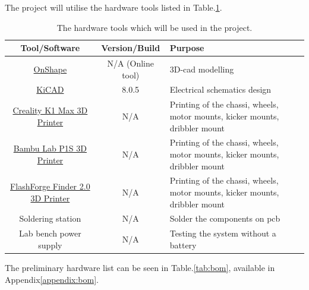 The project will utilise the hardware tools listed in Table.\:\ref{tab:harware_tools}.
\begin{table}[H]
    \centering
    \caption{The hardware tools which will be used in the project.}
    \label{tab:harware_tools}
    \begin{tabularx}{\textwidth}{|c|c|X|} \hline
         \textbf{Tool/Software} & \textbf{Version/Build} & \textbf{Purpose} \\ \hline
         \href{https://www.onshape.com/en/}{OnShape} & N/A (Online tool) & 3D-\acs{cad} modelling \\ \hline
         \href{https://www.kicad.org/}{KiCAD} & 8.0.5 & Electrical schematics design \\ \hline
         \href{https://www.creality.com/products/creality-k1-max-3d-printer}{Creality K1 Max 3D Printer} & N/A & Printing of the chassi, wheels, motor mounts, kicker mounts, dribbler mount \\ \hline
         \href{https://eu.store.bambulab.com/en-se/products/p1s}{Bambu Lab P1S 3D Printer} & N/A & Printing of the chassi, wheels, motor mounts, kicker mounts, dribbler mount \\ \hline
         \href{https://www.clasohlson.com/se/3D-skrivare-FlashForge-Finder-2.0/p/38-9154}{FlashForge Finder 2.0 3D Printer} & N/A & Printing of the chassi, wheels, motor mounts, kicker mounts, dribbler mount \\ \hline
         Soldering station & N/A & Solder the components on \ac{pcb} \\ \hline
         Lab bench power supply & N/A & Testing the system without a battery \\ \hline
    \end{tabularx}
\end{table}

The preliminary hardware list can be seen in Table.\:\ref{tab:bom}, available in Appendix\:\ref{appendix:bom}.

